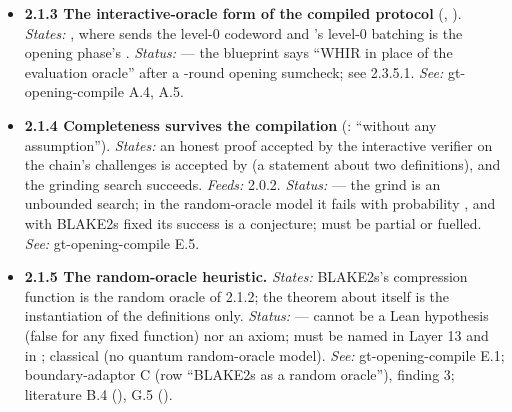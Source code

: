 \begin{itemize}[label={}, leftmargin=1.3em, itemindent=-1.3em, labelwidth=0pt, labelsep=0pt, itemsep=4pt, topsep=3pt]
\begin{itemize}[label={}, leftmargin=1.3em, itemindent=-1.3em, labelwidth=0pt, labelsep=0pt, itemsep=4pt, topsep=3pt]
\item {}\label{obl:node-2.1.2.7}\textbf{2.1.2.7 Plain knowledge soundness from the round-by-round form} (ArkLib , ). \emph{States:} an interactive prover convinces the verifier without a good first message with probability at most . \emph{Feeds:} the blueprint's plain corollary (); not needed if 2.1.2.1 consumes the round-by-round form directly. \emph{Status:} ; its transcript-level half is proved by lib-arklib's probe  in forty lines; its conclusion forgets the named extractor. \emph{See:} lib-arklib D.1, D.3, G.3; code-spine C.7.
\end{itemize}
\item {}\label{obl:node-2.1.3}\oblflag\textbf{2.1.3 The interactive-oracle form of the compiled protocol} (, ). \emph{States:} , where  sends the level-0 codeword and 's level-0 batching is the opening phase's . \emph{Status:}   — the blueprint says ``WHIR in place of the evaluation oracle'' after a -round opening sumcheck; see 2.3.5.1. \emph{See:} gt-opening-compile A.4, A.5.
\item {}\label{obl:node-2.1.4}\oblflag\textbf{2.1.4 Completeness survives the compilation} (: ``without any assumption''). \emph{States:} an honest proof accepted by the interactive verifier on the chain's challenges is accepted by  (a statement about two definitions), and the grinding search succeeds. \emph{Feeds:} 2.0.2. \emph{Status:}   — the grind is an unbounded search; in the random-oracle model it fails with probability , and with BLAKE2s fixed its success is a conjecture;  must be partial or fuelled. \emph{See:} gt-opening-compile E.5.
\item {}\label{obl:node-2.1.5}\textbf{2.1.5 The random-oracle heuristic.} \emph{States:} BLAKE2s's compression function is the random oracle  of 2.1.2; the theorem about  itself is the instantiation of the definitions only. \emph{Status:}  — cannot be a Lean hypothesis (false for any fixed function) nor an axiom; must be named in Layer 13 and in ; classical (no quantum random-oracle model). \emph{See:} gt-opening-compile E.1; boundary-adaptor C (row ``BLAKE2s as a random oracle''), finding 3; literature B.4 (), G.5 ().

\end{itemize}

